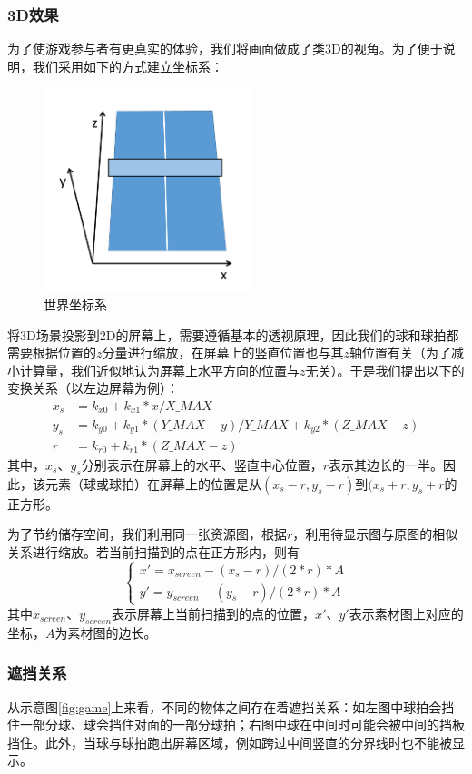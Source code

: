 \documentclass[UTF8]{article}
\begin{document}
\subsubsection{3D效果}
为了使游戏参与者有更真实的体验，我们将画面做成了类3D的视角。为了便于说明，我们采用如下的方式建立坐标系：
\begin{figure}[H]
  \centering
  \includegraphics[width=6cm]{2-10.png}
  \caption{世界坐标系}
\end{figure}
将3D场景投影到2D的屏幕上，需要遵循基本的透视原理，因此我们的球和球拍都需要根据位置的$z$分量进行缩放，在屏幕上的竖直位置也与其$z$轴位置有关（为了减小计算量，我们近似地认为屏幕上水平方向的位置与$z$无关）。于是我们提出以下的变换关系（以左边屏幕为例）：
\[\begin{aligned}
x_s&=k_{x0} + k_{x1} * x / X\_MAX \\
y_s&=k_{y0} + k_{y1} * (Y\_MAX - y) / Y\_MAX + k_{y2} * (Z\_MAX - z) \\
r&=k_{r0} + k_{r1} * (Z\_MAX - z)
\end{aligned}\]
其中，$x_s$、$y_s$分别表示在屏幕上的水平、竖直中心位置，$r$表示其边长的一半。因此，该元素（球或球拍）在屏幕上的位置是从$(x_{s}-r, y_{s}-r)$到$(x_{s}+r,y_{s}+r$的正方形。

为了节约储存空间，我们利用同一张资源图，根据$r$，利用待显示图与原图的相似关系进行缩放。若当前扫描到的点在正方形内，则有
\[\begin{cases}
    x' = x_{screen} - (x_s-r) / (2 * r) * A \\
    y' = y_{screen} - (y_s-r) / (2 * r) * A
  \end{cases}\]
其中$x_{screen}$、$y_{screen}$表示屏幕上当前扫描到的点的位置，$x'$、$y'$表示素材图上对应的坐标，$A$为素材图的边长。

\subsubsection{遮挡关系}
从示意图\ref{fig:game}上来看，不同的物体之间存在着遮挡关系：如左图中球拍会挡住一部分球、球会挡住对面的一部分球拍；右图中球在中间时可能会被中间的挡板挡住。此外，当球与球拍跑出屏幕区域，例如跨过中间竖直的分界线时也不能被显示。
\end{document}
